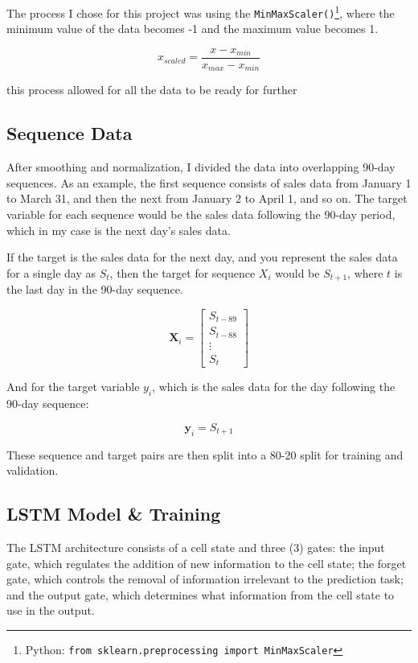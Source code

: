\documentclass[10pt, journal, letterpaper, compsoc]{IEEEtran}
\begin{document}
The process I chose for this project was using the \texttt{MinMaxScaler()}\footnote{Python: \texttt{from sklearn.preprocessing import MinMaxScaler}}, where the minimum value of the data becomes \textsc{-1} and the maximum value becomes \textsc{1}.

$$
x_{scaled} = \frac{x-x_{min}}{x_{max}-x_{min}}
$$

this process allowed for all the data to be ready for further 

\subsection{Sequence Data}
After smoothing and normalization, I divided the data into overlapping 90-day sequences. As an example, the first sequence consists of sales data from January 1 to March 31, and then the next from January 2 to April 1, and so on. The target variable for each sequence would be the sales data following the 90-day period, which in my case is the next day's sales data.

If the target is the sales data for the next day, and you represent the sales data for a single day as $S_t$, then the target for sequence $X_i$ would be $S_{t+1}$, where $t$ is the last day in the 90-day sequence.

$$
\mathbf{X}_i = \begin{bmatrix} 
S_{t-89} \\ 
S_{t-88} \\ 
\vdots \\ 
S_t 
\end{bmatrix}
$$

And for the target variable $y_i$, which is the sales data for the day following the 90-day sequence:

$$
\mathbf{y}_i = S_{t+1}
$$

These sequence and target pairs are then split into a 80-20 split for training and validation.


\subsection{LSTM Model \& Training}
The LSTM architecture consists of a cell state and three (3) gates: the input gate, which regulates the addition of new information to the cell state; the forget gate, which controls the removal of information irrelevant to the prediction task; and the output gate, which determines what information from the cell state to use in the output.
\end{document}
